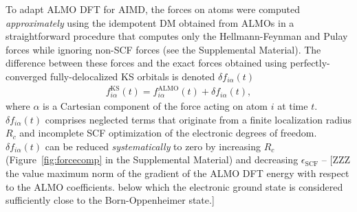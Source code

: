 \documentclass[aps,prl,reprint,amsmath,amssymb]{revtex4-1}
\begin{document}

To adapt ALMO DFT for AIMD, the forces on atoms were computed \emph{approximately} using the idempotent DM obtained from ALMOs in a straightforward procedure that computes only the Hellmann-Feynman and Pulay forces while ignoring non-SCF forces (see the Supplemental Material). 
The difference between these forces and the exact forces obtained using perfectly-converged fully-delocalized KS orbitals is denoted $\delta f_{i\alpha}(t)$ 
%
\begin{align}
\label{eq:deltaf}
f^{\text{KS}}_{i\alpha}(t) = f^{\text{ALMO}}_{i\alpha}(t) + \delta f_{i\alpha} (t),
\end{align}
%
where $\alpha$ is a Cartesian component of the force acting on atom $i$ at time $t$. $\delta f_{i\alpha} (t)$ comprises neglected terms that originate from %
a finite localization radius $R_c$ and incomplete SCF optimization of the electronic degrees of freedom. 
$\delta f_{i\alpha} (t)$ can be reduced \emph{systematically} to zero by increasing $R_c$ (Figure~\ref{fig:forcecomp} in the Supplemental Material) and decreasing $\epsilon_{\text{SCF}}$ -- [ZZZ the value maximum norm of the gradient of the \mbox{ALMO} DFT energy with respect to the ALMO coefficients. below which the electronic ground state is considered sufficiently close to the Born-Oppenheimer state.]
\end{document}
